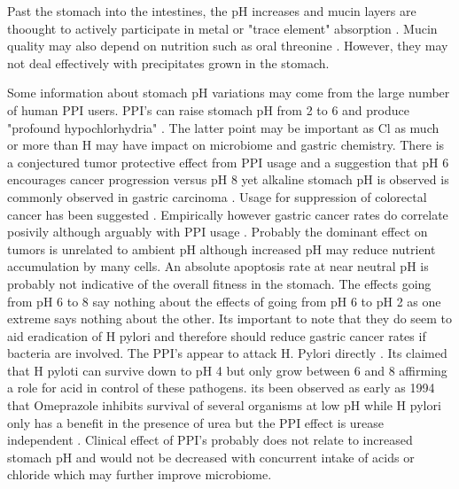 {Past the stomach into the intestines,  the pH increases
and mucin layers are thoought
to actively participate in metal or "trace element" absorption
\cite{Einhorn_Haase_Maares_Interaction_competition_2024}.
Mucin quality may also depend on nutrition such as
oral threonine
\cite{Law_Bertolo_AdjiriAwere_Adequate_oral_threonine_2007}
.  However, they 
may not deal effectively with precipitates grown
in the stomach. 


Some information about stomach pH variations may come
from the large number of human PPI users.
PPI's  can raise stomach pH from 2 to 6 and produce "profound 
hypochlorhydria" \cite{PMC4254461}. The latter point may be
important as Cl as much or more  than H may have impact on microbiome
and gastric chemistry. 
There is  a conjectured tumor protective effect from PPI usage
and  a suggestion
that pH 6 encourages cancer progression
versus pH 8 \cite{PMC7085403}
yet alkaline stomach pH is observed is commonly observed
in gastric carcinoma \cite{10.1007/978-4-431-68246-2_26}.
Usage for suppression of colorectal cancer has been suggested
\cite{Kim_Lee_Hong_Novel_Application_Proton_}.
Empirically however gastric cancer rates do correlate 
posivily although arguably with PPI usage
\cite{Waldum_Sordal_Fossmark_Proton_pump_inhibitors_PPIs_2018}
\cite{Segna_Brusselaers_Glaus_Association_between_proton_pump_2021}
\cite{PMC10308480}
.
Probably the dominant effect on tumors is unrelated to ambient
pH although increased pH may reduce nutrient
accumulation by many cells. An absolute apoptosis rate
at near neutral pH is probably not indicative of the
overall fitness in the stomach. 
The effects going from pH 6 to 8 say nothing about the effects
of going from pH 6 to pH 2 as one extreme says nothing about the other. 
Its important to note that they do seem to aid eradication of
H pylori and therefore should reduce gastric cancer rates
if bacteria are involved.
The PPI's appear to attack H. Pylori directly 
\cite{Saniee_Shahreza_Siavoshi_Negative_Effect_Protonpump_2016}
\cite{Atif_Hatefi_Arven_Consumption_antibacterial_2024}
. Its claimed that H pyloti can  survive down to pH 4 but only grow
between 6 and 8 \cite{Marcus2023} affirming a role for
acid in control of these pathogens. 
its been observed as early as  1994 that Omeprazole inhibits
survival of several organisms at low pH while H pylori
only has a benefit in the presence of urea
but the PPI effect is urease independent
\cite{McGowan_Cover_Blaser_proton_pump_inhibitor_1994}.
Clinical effect  of PPI's probably does not relate to increased
stomach pH and would  not be decreased with concurrent
intake of acids or chloride which may further improve microbiome.

}
